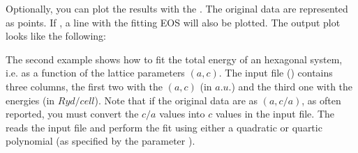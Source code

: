\documentclass[letterpaper,10pt,english]{sphinxmanual}
\let\sphinxpxdimen\pdfpxdimen\else\newdimen\sphinxpxdimen
\begin{document}
\begin{sphinxVerbatim}[commandchars=\\\{\}]
  
  
\end{sphinxVerbatim}

Optionally, you can plot the results with the . The original data are represented as points. If , a line with the fitting EOS will also be plotted. The output plot looks like the following:

\noindent\sphinxincludegraphics[width=500\sphinxpxdimen]{{figure_1}.png}

The second example shows how to fit the total energy of an hexagonal system, i.e. as a function of the lattice parameters \((a,c)\). The input file () contains three columns, the first two with the \((a,c)\) (in \(a.u.\)) and the third one with the energies (in \(Ryd/cell\)). Note that if the original data are as \((a,c/a)\), as often reported, you must convert the \(c/a\) values into \(c\) values in the input file.
The  reads the input file and perform the fit using either a quadratic or quartic polynomial (as specified by the parameter ).
\end{document}
